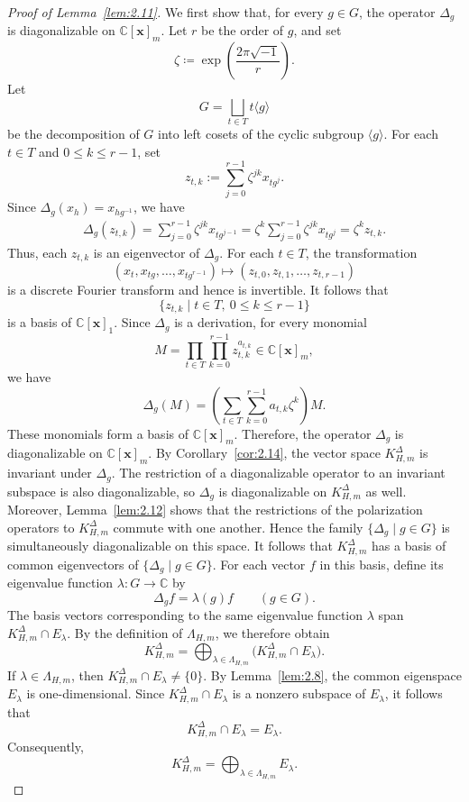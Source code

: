 \documentclass[12pt,a4paper]{article}
\theoremstyle{definition}
\numberwithin{definition}{section}
\begin{document}
\begin{proof}[Proof of Lemma~\ref{lem:2.11}]
We first show that, for every $g\in G$,
the operator $\Delta_g$ is diagonalizable on $\mathbb C[\bm x]_m$.
Let $r$ be the order of $g$, and set
\[
\zeta \coloneqq \exp\left(\frac{2\pi \sqrt{-1}}{r}\right).
\]
Let
\[
G = \bigsqcup_{t \in T}t \langle g \rangle
\]
be the decomposition of $G$ into left cosets of the cyclic subgroup $\langle g\rangle$.
For each $t\in T$ and $0\leq k\leq r-1$, set
\[
 z_{t,k}
 :=
 \sum_{j=0}^{r-1}\zeta^{jk}x_{tg^j}.
\]
Since $\Delta_g(x_h)=x_{hg^{-1}}$, we have
\begin{align*}
\Delta_g(z_{t,k})
=
\sum_{j=0}^{r-1}\zeta^{jk}x_{tg^{j-1}}
= \zeta^k \sum_{j=0}^{r-1}\zeta^{jk}x_{tg^j}
= \zeta^k z_{t,k}.
\end{align*}
Thus, each $z_{t,k}$ is an eigenvector of $\Delta_g$.
For each $t\in T$, the transformation
\[
(x_t, x_{tg}, \ldots, x_{tg^{r-1}})
\mapsto
(z_{t, 0}, z_{t, 1}, \ldots, z_{t, r-1})
\]
is a discrete Fourier transform and hence is invertible.
It follows that
\[
 \{z_{t,k}\mid t\in T,\ 0\leq k\leq r-1\}
\]
is a basis of $\mathbb C[\bm x]_1$.
Since $\Delta_g$ is a derivation, for every monomial
\[
M =
\prod_{t\in T}\prod_{k=0}^{r-1}
z_{t,k}^{a_{t,k}} \in \mathbb{C}[\bm{x}]_{m},
\]
we have
\[
 \Delta_g(M)
 =
 \left(
 \sum_{t\in T}\sum_{k=0}^{r-1}
 a_{t,k}\zeta^k
 \right)M.
\]
These monomials form a basis of $\mathbb C[\bm x]_m$.
Therefore, the operator $\Delta_g$ is diagonalizable on $\mathbb C[\bm x]_m$.
By Corollary~\ref{cor:2.14}, the vector space $K_{H,m}^\Delta$
is invariant under $\Delta_g$.
The restriction of a diagonalizable operator to an invariant subspace
is also diagonalizable, so $\Delta_g$ is diagonalizable on $K_{H,m}^\Delta$ as well.
Moreover, Lemma~\ref{lem:2.12} shows that the restrictions of the polarization operators
to $K_{H,m}^\Delta$ commute with one another.
Hence the family $\{\Delta_g\mid g\in G\}$ is simultaneously diagonalizable on this space.
It follows that $K_{H,m}^\Delta$ has a basis of common eigenvectors
of $\{\Delta_g\mid g\in G\}$.
For each vector $f$ in this basis, define its eigenvalue function
$\lambda\colon G\to\mathbb C$ by
\[
\Delta_g f=\lambda(g)f\qquad(g\in G).
\]
The basis vectors corresponding to the same eigenvalue function $\lambda$
span $K_{H,m}^\Delta\cap E_\lambda$.
By the definition of $\Lambda_{H,m}$, we therefore obtain
\[
K_{H,m}^{\Delta}
=
\bigoplus_{\lambda\in\Lambda_{H,m}}
\bigl(K_{H,m}^{\Delta}\cap E_\lambda\bigr).
\]
If $\lambda\in\Lambda_{H,m}$, then
$K_{H,m}^\Delta\cap E_\lambda\ne\{0\}$.
By Lemma~\ref{lem:2.8}, the common eigenspace $E_\lambda$ is one-dimensional.
Since $K_{H,m}^\Delta\cap E_\lambda$ is a nonzero subspace of $E_\lambda$, it follows that
\[
K_{H,m}^{\Delta}\cap E_\lambda=E_\lambda.
\]
Consequently,
\[
K_{H,m}^{\Delta}
=
\bigoplus_{\lambda\in\Lambda_{H,m}}E_\lambda.
\]
\end{proof}
\end{document}
